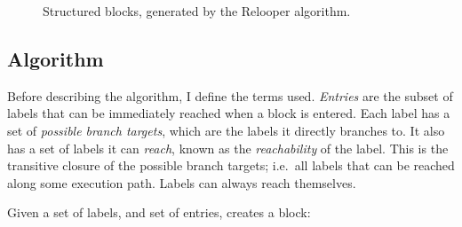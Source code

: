 \documentclass[00-main.tex]{subfiles}
\begin{document}
\begin{figure}[t]
  \centering
  \caption{Structured blocks, generated by the Relooper algorithm.}
  \label{fig:relooper output blocks structure} %
\end{figure}

\subsection{Algorithm}\label{sec:prep:relooper algorithm}

Before describing the algorithm, I define the terms used.
\emph{Entries} are the subset of labels that can be immediately reached when a block is entered.
Each label has a set of \emph{possible branch targets}, which are the labels it directly branches to.
It also has a set of labels it can \emph{reach}, known as the \emph{reachability} of the label.
This is the transitive closure of the possible branch targets; i.e.\ all labels that can be reached along some execution path.
Labels can always reach themselves.

Given a set of labels, and set of entries,  creates a block:
\end{document}
